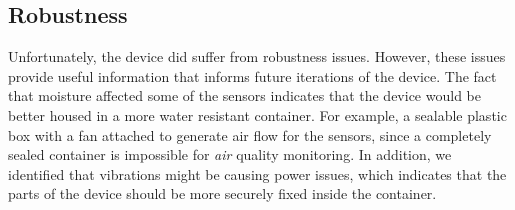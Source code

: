 \documentclass[11pt,twosided,a4paper]{report}
\begin{document}
\subsection{Robustness}

Unfortunately, the device did suffer from robustness issues. However, these issues provide useful information that informs future iterations of the device. The fact that moisture affected some of the sensors indicates that the device would be better housed in a more water resistant container. For example, a sealable plastic box with a fan attached to generate air flow for the sensors, since a completely sealed container is impossible for \textit{air} quality monitoring. In addition, we identified that vibrations might be causing power issues, which indicates that the parts of the device should be more securely fixed inside the container.
\end{document}
